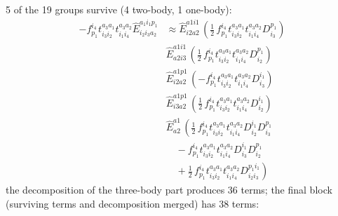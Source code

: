 \documentclass[11pt]{article}
\begin{document}
5 of the 19 groups survive (4 two-body, 1 one-body):
\begin{align}
- f^{i_{4}}_{p_{1}} t^{a_{3}a_{1}}_{i_{3}i_{2}} t^{a_{3}a_{2}}_{i_{1}i_{4}} \hat{E}^{a_{1}i_{1}p_{1}}_{i_{2}i_{3}a_{2}} &\approx \hat{E}^{a1i1}_{i2a2}\,\left(\tfrac{1}{2}\, f^{i_{4}}_{p_{1}} t^{a_{3}a_{1}}_{i_{3}i_{2}} t^{a_{3}a_{2}}_{i_{1}i_{4}} D^{p_{1}}_{i_{3}} \right) \\
&\hat{E}^{a1i1}_{a2i3}\,\left(\tfrac{1}{2}\, f^{i_{4}}_{p_{1}} t^{a_{3}a_{1}}_{i_{3}i_{2}} t^{a_{3}a_{2}}_{i_{1}i_{4}} D^{p_{1}}_{i_{2}} \right) \\
&\hat{E}^{a1p1}_{i2a2}\,\left(- f^{i_{4}}_{p_{1}} t^{a_{3}a_{1}}_{i_{3}i_{2}} t^{a_{3}a_{2}}_{i_{1}i_{4}} D^{i_{1}}_{i_{3}} \right) \\
&\hat{E}^{a1p1}_{i3a2}\,\left(\tfrac{1}{2}\, f^{i_{4}}_{p_{1}} t^{a_{3}a_{1}}_{i_{3}i_{2}} t^{a_{3}a_{2}}_{i_{1}i_{4}} D^{i_{1}}_{i_{2}} \right) \\
&\hat{E}^{a1}_{a2}\,\left(\tfrac{1}{2}\, f^{i_{4}}_{p_{1}} t^{a_{3}a_{1}}_{i_{3}i_{2}} t^{a_{3}a_{2}}_{i_{1}i_{4}} D^{i_{1}}_{i_{2}} D^{p_{1}}_{i_{3}} \right. \\
&\left.\quad - f^{i_{4}}_{p_{1}} t^{a_{3}a_{1}}_{i_{3}i_{2}} t^{a_{3}a_{2}}_{i_{1}i_{4}} D^{i_{1}}_{i_{3}} D^{p_{1}}_{i_{2}} \right. \\
&\left.\quad + \tfrac{1}{2}\, f^{i_{4}}_{p_{1}} t^{a_{3}a_{1}}_{i_{3}i_{2}} t^{a_{3}a_{2}}_{i_{1}i_{4}} D^{p_{1}i_{1}}_{i_{2}i_{3}} \right)
\end{align}
the decomposition of the three-body part produces 36 terms; the final block (surviving terms and decomposition merged) has 38 terms:
\end{document}
